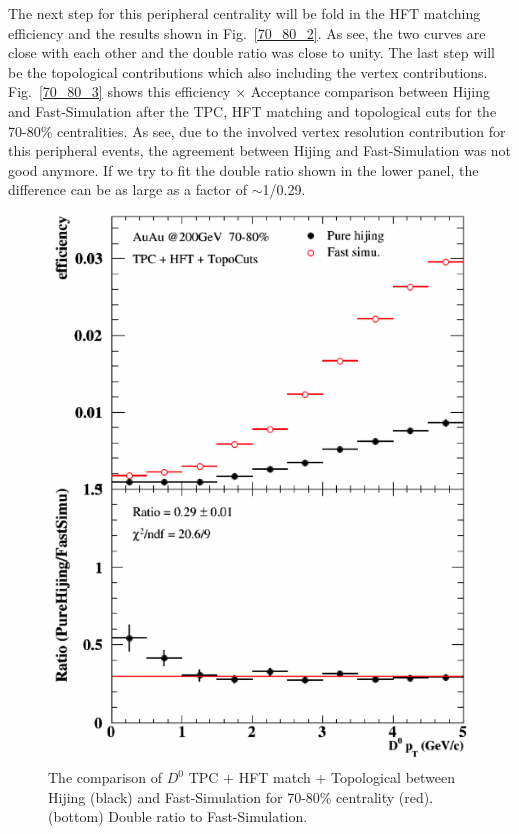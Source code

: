 \documentclass[a4paper]{article}
\begin{document}
The next step for this peripheral centrality will be fold in the HFT matching efficiency and the results shown in Fig.~\ref{70_80_2}. As see, the two curves are close with each other and the double ratio was close to unity. The last step will be the topological contributions which also including the vertex contributions. Fig.~\ref{70_80_3} shows this efficiency $\times$ Acceptance comparison between Hijing and Fast-Simulation after the TPC, HFT matching and topological cuts for the 70-80\% centralities. As see, due to the involved vertex resolution contribution for this peripheral events, the agreement between Hijing and Fast-Simulation was not good anymore. If we try to fit the double ratio shown in the lower panel, the difference can be as large as a factor of $\sim$1/0.29.


\begin{figure}[htbp]
\begin{minipage}[htbp]{0.47\linewidth}
\centering
\includegraphics[width=1.0\textwidth,angle=0]{fig/70_80.png}
\caption{ The comparison of $D^0$ TPC + HFT match + Topological between Hijing (black) and Fast-Simulation for 70-80\% centrality (red). (bottom) Double ratio to Fast-Simulation.\label{70_80}}

\end{minipage}
\end{figure}
\end{document}
